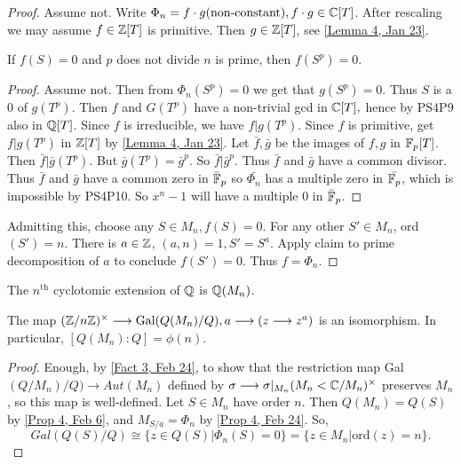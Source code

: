 \begin{proof}
Assume not. Write $\Phi_n=f\cdot g(\text{non-constant}),f\cdot g\in \mathbb{C}[T]$. After rescaling we may assume $f\in \mathbb{Z}[T]$ is primitive. Then $g\in \mathbb{Z}[T]$, see \ref{Lemma 4, Jan 23}.
\begin{claim}
If $f(S)=0$ and $p$ does not divide $n$ is prime, then $f(S^p)=0$.
\end{claim}
\begin{proof}
Assume not. Then from $\Phi_n(S^p)=0$ we get that $g(S^p)=0$. Thus $S$ is a 0 of $g(T^p)$. Then $f$ and $G(T^p)$ have a non-trivial gcd in $\mathbb{C}[T],$ hence by PS4P9 also in $\mathbb{Q}[T]$. Since $f$ is irreducible, we have $f|g(T^p)$. Since $f$ is primitive, get $f|g(T^p)$ in $\mathbb{Z}[T]$ by \ref{Lemma 4, Jan 23}. Let $\bar{f},\bar{g}$ be the images of $f,g$ in $\mathbb{F}_p[T]$. Then $\bar{f}|\bar{g}(T^p)$. But $\bar{g}(T^p)=\bar{g}^p$. So $\bar{f}|\bar{g}^p$. Thus $\bar{f}$ and $\bar{g}$ have a common divisor. Thus $\bar{f}$ and $\bar{g}$ have a common zero in $\bar{\mathbb{F}}_p$ so $\bar{\Phi_n}$ has a multiple zero in $\bar{\mathbb{F}_p}$, which is impossible by PS4P10. So $x^n-1$ will have a multiple 0 in $\bar{\mathbb{F}}_p$.
\end{proof}
Admitting this, choose any $S\in M_n, f(S)=0$. For any other $S'\in M_n$, ord$(S')=n$. There is $a\in \mathbb{Z}$, $(a,n)=1, S'=S^a$. Apply claim to prime decomposition of $a$ to conclude $f(S')=0$. Thus $f=\Phi_n$.
\end{proof}
\begin{defn}
The $n^\textrm{th}$ cyclotomic extension of $\mathbb{Q}$ is $\mathbb{Q}(M_n)$.
\end{defn}
\begin{prop} \label{Prop 6, Feb 24}
The map $(\mathbb{Z} / n \mathbb{Z})^{\times}\longrightarrow\text{Gal}(Q(M_n)/Q),a\longrightarrow (z\longrightarrow z^a)$ is an isomorphism. In particular, $[Q(M_n):Q]=\phi(n)$.
\end{prop}
\begin{proof}
Enough, by \ref{Fact 3, Feb 24}, to show that the restriction map Gal$(Q/M_n)/Q)\longrightarrow Aut(M_n)$ defined by $\sigma\longrightarrow \sigma|_{M_n}(M_n< \mathbb{C}/M_n)^{\times}$ preserves $M_n$, so this map is well-defined. Let $S\in M_n$ have order $n$. Then $Q(M_n)=Q(S)$ by \ref{Prop 4, Feb 6}, and $M_{S/a}=\Phi_n$ by \ref{Prop 4, Feb 24}. So,
$${Gal}(Q(S)/Q)\cong \{z\in Q(S)|\Phi_n(S)=0\}=\{z\in M_n|\text{ord}(z)=n\}.$$
\end{proof}
